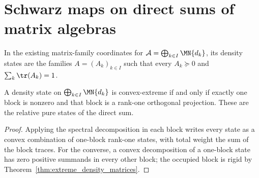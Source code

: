 \section{Schwarz maps on direct sums of matrix algebras}

\begin{definition}
    \label{def:direct_sum_density_matrices}
    \leanok
    In the existing matrix-family coordinates for
    $\mathcal A=\bigoplus_{k\in I}\MN{d_k}$, its density states are the
    families $A=(A_k)_{k\in I}$ such that every $A_k\succeq0$ and
    $\sum_k\tr(A_k)=1$.
\end{definition}

\begin{theorem}
    \label{thm:extreme_direct_sum_density_matrices}
    \leanok
    A density state on $\bigoplus_{k\in I}\MN{d_k}$ is convex-extreme if
    and only if exactly one block is nonzero and that block is a rank-one
    orthogonal projection. These are the relative pure states of the direct
    sum.
\end{theorem}

\begin{proof}\leanok
    Applying the spectral decomposition in each block writes every state as
    a convex combination of one-block rank-one states, with total weight the
    sum of the block traces. For the converse, a convex decomposition of a
    one-block state has zero positive summands in every other block; the
    occupied block is rigid by
    Theorem~\ref{thm:extreme_density_matrices}.
\end{proof}

